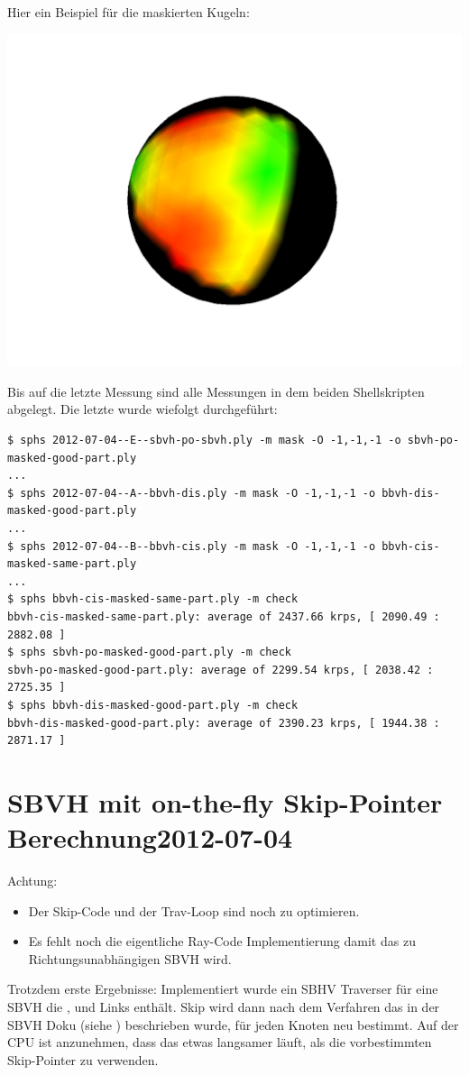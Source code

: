 \documentclass[a4paper,11pt]{article}
\begin{document}
\begin{itemize}
	Hier ein Beispiel für die maskierten Kugeln:
	\begin{center}
	\includegraphics[width=.45\textwidth]{2012-07-04/masked-sphere.png}\hfill
	\end{center}

\end{itemize}

Bis auf die letzte Messung sind alle Messungen in dem beiden Shellskripten abgelegt.
Die letzte wurde wiefolgt durchgeführt:

{\small
\begin{verbatim}
$ sphs 2012-07-04--E--sbvh-po-sbvh.ply -m mask -O -1,-1,-1 -o sbvh-po-masked-good-part.ply
...
$ sphs 2012-07-04--A--bbvh-dis.ply -m mask -O -1,-1,-1 -o bbvh-dis-masked-good-part.ply
...
$ sphs 2012-07-04--B--bbvh-cis.ply -m mask -O -1,-1,-1 -o bbvh-cis-masked-same-part.ply
...
$ sphs bbvh-cis-masked-same-part.ply -m check
bbvh-cis-masked-same-part.ply: average of 2437.66 krps, [ 2090.49 : 2882.08 ]
$ sphs sbvh-po-masked-good-part.ply -m check
sbvh-po-masked-good-part.ply: average of 2299.54 krps, [ 2038.42 : 2725.35 ]
$ sphs bbvh-dis-masked-good-part.ply -m check
bbvh-dis-masked-good-part.ply: average of 2390.23 krps, [ 1944.38 : 2871.17 ]
\end{verbatim}}




\section{SBVH mit on-the-fly Skip-Pointer Berechnung\hfill 2012-07-04}
Achtung: 
\begin{itemize}
\item Der Skip-Code und der Trav-Loop sind noch zu optimieren.
\item Es fehlt noch die eigentliche Ray-Code Implementierung damit das zu Richtungsunabhängigen SBVH wird.
\end{itemize}

Trotzdem erste Ergebnisse:
Implementiert wurde ein SBHV Traverser für eine SBVH die ,  und  Links enthält.
Skip wird dann nach dem Verfahren das in der SBVH Doku (siehe ) beschrieben wurde, für jeden
	Knoten neu bestimmt.
Auf der CPU ist anzunehmen, dass das etwas langsamer läuft, als die vorbestimmten Skip-Pointer zu verwenden.
\end{document}
